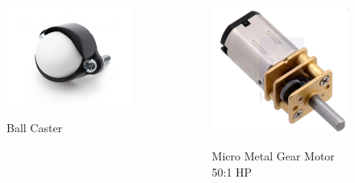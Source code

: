 \documentclass
   [kulak] %
   {kulakbeamer}
\begin{document}
\begin{frame}
\begin{columns}
\begin{figure}
			\centering
			\includegraphics[width=.7\textwidth]{ballcaster}
			\caption{\scriptsize Ball Caster}\cite{BallCaster}
		\end{figure}
		\begin{figure}
			\centering
			\includegraphics[width=.6\textwidth]{gear}
			\caption{\scriptsize Micro Metal Gear Motor 50:1 HP}\cite{MicroMetalGearMotor50:1HP}
		\end{figure}
	\end{columns}
	
\end{frame}
\end{document}

